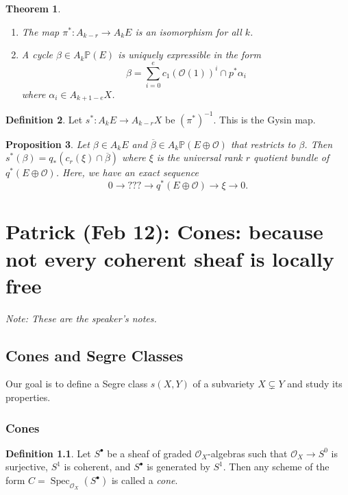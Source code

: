 \documentclass[leqno, openany]{memoir}
\newtheorem{thm}{Theorem}[section]
\newtheorem{prop}[thm]{Proposition}
\theoremstyle{definition}
\newtheorem{defn}[thm]{Definition}
\theoremstyle{remark}
\theoremstyle{plain}
\theoremstyle{definition}
\theoremstyle{remark}
\renewcommand{\P}{\mathbb{P}}
\newcommand{\mc}[1]{\mathcal{#1}}
\newcommand{\ol}[1]{\overline{#1}}
\DeclareMathOperator{\Spec}{Spec}
\begin{document}
\begin{thm}\leavevmode \begin{enumerate} \item The map $\pi^* \colon A_{k-r}
    \to A_k E$ is an isomorphism for all $k$.  \item A cycle $\beta \in A_k
    \P(E)$ is uniquely expressible in the form \[ \beta = \sum_{i=0}^e
    {c_1(\mc{O}(1))}^i \cap p^* \alpha_i \] where $\alpha_i \in A_{k+1-e} X$.
    \end{enumerate} \end{thm}

\begin{defn} Let $s^* \colon A_k E \to A_{k-r} X$ be ${(\pi^*)}^{-1}$. This is
the Gysin map.  \end{defn}

\begin{prop} Let $\beta \in A_k E$ and $\ol{\beta} \in A_k \P(E \oplus \mc{O})$
    that restricts to $\beta$. Then $s^*(\beta) = q_* (c_r(\xi) \cap
    \ol{\beta})$ where $\xi$ is the universal rank $r$ quotient bundle of $q^*
    (E \oplus \mc{O})$. Here, we have an exact sequence \[ 0 \to {???} \to
    q^*(E \oplus \mc{O}) \to \xi \to 0. \] \end{prop}

\chapter{Patrick (Feb 12): Cones: because not every coherent sheaf is locally
free}%

\textit{Note: These are the speaker's notes.} 

\section{Cones and Segre Classes}%

Our goal is to define a Segre class $s(X,Y)$ of a subvariety $X \subsetneq Y$
and study its properties.

\subsection{Cones}%

\begin{defn} Let $S^{\bullet}$ be a sheaf of graded $\mc{O}_X$-algebras such
    that $\mc{O}_X \to S^0$ is surjective, $S^1$ is coherent, and $S^{\bullet}$
    is generated by $S^1$. Then any scheme of the form $C =
    \Spec_{\mc{O}_X}(S^{\bullet})$ is called a \textit{cone}.  \end{defn}
\end{document}

